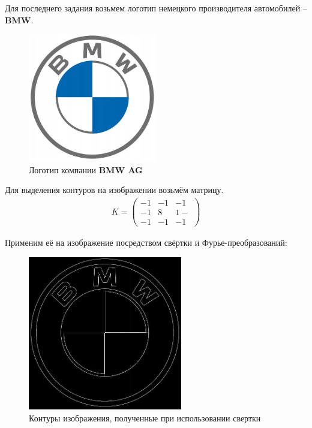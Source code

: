 Для последнего задания возьмем логотип немецкого производителя автомобилей -- \textbf{BMW}.

\begin{figure}[ht!]
    \centering
    \includegraphics[width=0.5\textwidth]{images/source_images/task_4/bmw.jpeg}
    \caption{Логотип компании \textbf{BMW AG}}
    \label{fig:bmw}
\end{figure}
Для выделения контуров на изображении возьмём матрицу.
\begin{gather}
    K = \begin{pmatrix}
        -1 & -1 & -1\\
        -1 & 8 & 1-\\
        -1 & -1 & -1
    \end{pmatrix}  
\end{gather}

Применим её на изображение посредством свёртки и Фурье-преобразований:

\begin{figure}[ht!]
    \centering
    \includegraphics[width=0.6\textwidth]{images/result/task_4/Edges.png}
    \caption{Контуры изображения, полученные при использовании свертки}
    \label{fig:ed_c}
\end{figure}

